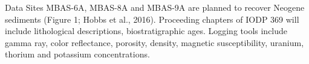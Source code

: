 Data
Sites MBAS-6A, MBAS-8A and MBAS-9A are planned to recover Neogene sediments (Figure 1; Hobbs et al., 2016). Proceeding chapters of IODP 369 will include lithological descriptions, biostratigraphic ages. Logging tools include gamma ray, color reflectance, porosity, density, magnetic susceptibility, uranium, thorium and potassium concentrations.
